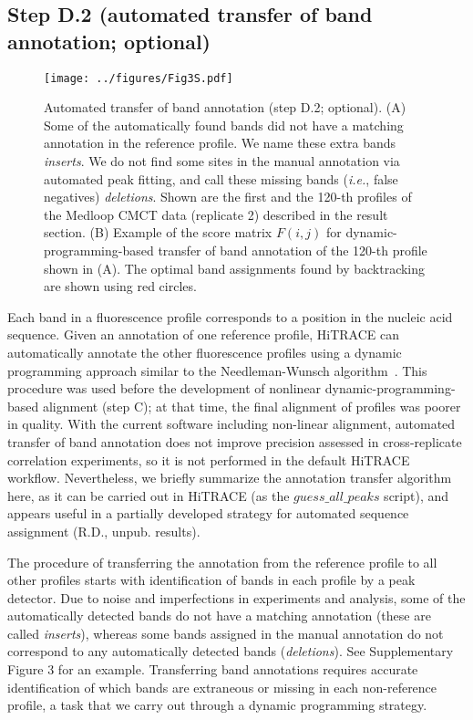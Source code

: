 \documentclass[letter]{bioinfo}
\newcommand{\ie}{{\it i.e.}}
\begin{document}
\subsection{Step D.2 (automated transfer of band annotation; optional)}
\begin{figure}
\centering
    \texttt{[image: ../figures/Fig3S.pdf]}
\caption{Automated transfer of band annotation (step D.2; optional). (A) Some of the automatically found bands did not have a matching annotation in the reference profile. We name these extra bands \emph{inserts}. We do not find some sites in the manual annotation via automated peak fitting, and call these missing bands (\ie, false negatives) \emph{deletions}. Shown are the first and the 120-th profiles of the Medloop CMCT data (replicate 2) described in the result section. (B) Example of the score matrix $F(i,j)$ for dynamic-programming-based transfer of band annotation of the 120-th profile shown in (A). The optimal band assignments found by backtracking are shown using red circles.}
\label{f:auto-anno}
\end{figure}

Each band in a fluorescence profile corresponds to a position in the nucleic acid sequence. Given an annotation of one reference profile, HiTRACE can automatically annotate the other fluorescence profiles using a dynamic programming approach similar to the Needleman-Wunsch algorithm~\citep{needleman1970general}. This procedure was used before the development of nonlinear dynamic-programming-based alignment (step C); at that time, the final alignment of profiles was poorer in quality. With the current software including non-linear alignment, automated transfer of band annotation does not improve precision assessed in cross-replicate correlation experiments, so it is not performed in the default HiTRACE workflow. Nevertheless, we briefly summarize the annotation transfer algorithm here, as it can be carried out in HiTRACE (as the $guess\_all\_peaks$ script), and appears useful in a partially developed strategy for automated sequence assignment (R.D., unpub. results).

The procedure of transferring the annotation from the reference profile to all other profiles starts with identification of bands in each profile by a peak detector. Due to noise and imperfections in experiments and analysis, some of the automatically detected bands do not have a matching annotation (these are called \emph{inserts}), whereas some bands assigned in the manual annotation do not correspond to any automatically detected bands (\emph{deletions}). See Supplementary Figure 3 for an example. Transferring band annotations requires accurate identification of which bands are extraneous or missing in each non-reference profile, a task that we carry out through a dynamic programming strategy.
\end{document}
